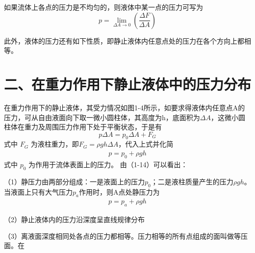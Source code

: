         如果流体上各点的压力是不均匀的，则液体中某一点的压力可写为
$$    p=\lim_{{\Delta A}\to 0}  (\frac {\Delta F}  {\Delta A } )   $$


        此外，液体的压力还有如下性质，即静止液体内任意点处的压力在各个方向上都相等。

\section*{二、在重力作用下静止液体中的压力分布} 

         在重力作用下的静止液体，其受力情况如图1-4所示，如要求得液体内任意点A的压力，可从自由液面向下取一微小圆柱体，其高度为h，底面积为$\Delta{A}$，这微小圆柱体在重力及周围压力作用下处于平衡状态，于是有
$${p\Delta{A}}={p_{0}\Delta{A}}+{F_{G}}$$
式中 ${F_{G}}$ 为液柱重力，即${F_{G}}={{\rho}gh}{\Delta{A}}$，代入上式并化简
\begin{gather}
    {p}={p_{0}}+{{\rho}gh}
\end{gather}
式中 ${p_{0}}$ 为作用于流体表面上的压力。
 由（1-14）可以看出：

（1）静压力由两部分组成：一是液面上的压力${p_{0}}$；二是液柱质量产生的压力${{\rho}gh}$。当液面上只有大气压力${p_{a}}$作用时，则A点处静压力为
\begin{gather}
    {p}={p}_{a}+{{\rho}gh}
\end{gather}

（2）静止液体内的压力沿深度呈直线规律分布

（3）离液面深度相同处各点的压力都相等。压力相等的所有点组成的面叫做等压面。在
